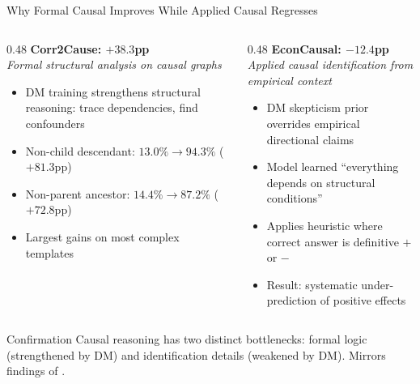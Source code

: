 \documentclass[aspectratio=169,12pt]{beamer}
\begin{document}
\begin{frame}{Why Formal Causal Improves While Applied Causal Regresses}
  \begin{columns}[T]
    \begin{column}{0.48\textwidth}
      \textbf{Corr2Cause: $+38.3$pp}\\
      \small\textit{Formal structural analysis on causal graphs}
      \begin{itemize}
        \item DM training strengthens structural reasoning: trace dependencies, find confounders
        \item Non-child descendant: $13.0\% \to 94.3\%$ ($+81.3$pp)
        \item Non-parent ancestor: $14.4\% \to 87.2\%$ ($+72.8$pp)
        \item Largest gains on most complex templates
      \end{itemize}
    \end{column}
    \begin{column}{0.48\textwidth}
      \textbf{EconCausal: $-12.4$pp}\\
      \small\textit{Applied causal identification from empirical context}
      \begin{itemize}
        \item DM skepticism prior overrides empirical directional claims
        \item Model learned ``everything depends on structural conditions''
        \item Applies heuristic where correct answer is definitive $+$ or $-$
        \item Result: systematic under-prediction of positive effects
      \end{itemize}
    \end{column}
  \end{columns}

  \vspace{0.5em}
  \begin{block}{Confirmation}
    Causal reasoning has two distinct bottlenecks: formal logic (strengthened by DM) and identification details (weakened by DM). Mirrors findings of \citet{syrgkanis2026causalreasoning}.
  \end{block}

\end{frame}
\end{document}
